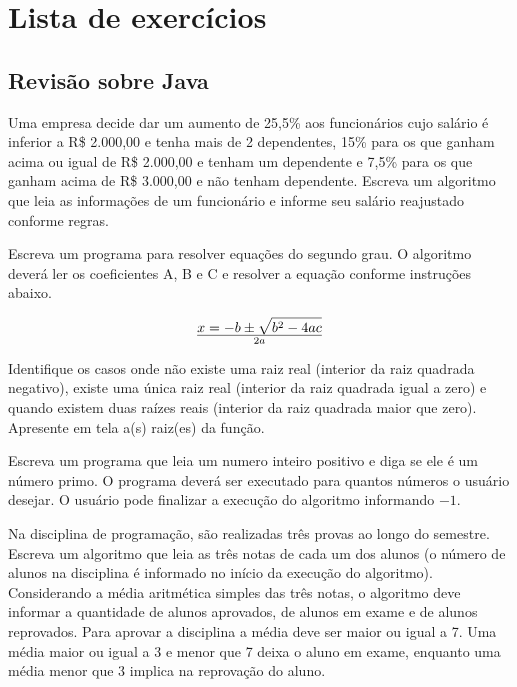\chapter{Lista de exercícios}
\renewcommand\thechapter{}
\renewcommand\thesection{\arabic{section}}

\section{Revisão sobre Java}

\begin{exercise}[Salario]
Uma empresa decide dar um aumento de 25,5\% aos funcionários cujo salário é inferior a R\$ 2.000,00 e tenha mais de 2 dependentes, 15\% para os que ganham acima ou igual de R\$ 2.000,00 e tenham um dependente e 7,5\% para os que ganham acima de R\$ 3.000,00 e não tenham dependente. Escreva um algoritmo que leia as informações de um funcionário e informe seu salário reajustado conforme regras.
\end{exercise}

\begin{exercise}[Bhaskara]
Escreva um programa para resolver equações do segundo grau. O algoritmo deverá ler os coeficientes A, B e C e resolver a equação conforme instruções abaixo.

$$
x = {-b \pm \sqrt{b^2 - 4ac}} \over {2a}
$$

Identifique os casos onde não existe uma raiz real (interior da raiz quadrada negativo), existe uma única raiz real (interior da raiz quadrada igual a zero) e quando existem duas raízes reais (interior da raiz quadrada maior que zero). Apresente em tela a(s) raiz(es) da função.

\end{exercise}

\begin{exercise}[NumeroPrimo]
Escreva um programa que leia um numero inteiro positivo e diga se ele é um número primo. O programa deverá ser executado para quantos números o usuário desejar. O usuário pode finalizar a execução do algoritmo informando $-1$.
\end{exercise}

\begin{exercise}[MediaTurma]
Na disciplina de programação, são realizadas três provas ao longo do semestre. Escreva um algoritmo que leia as três notas de cada um dos alunos (o número de alunos na disciplina é informado no início da execução do algoritmo). Considerando a média aritmética simples das três notas, o algoritmo deve informar a quantidade de alunos aprovados, de alunos em exame e de alunos reprovados. Para aprovar a disciplina a média deve ser maior ou igual a 7. Uma média maior ou igual a 3 e menor que 7 deixa o aluno em exame, enquanto uma média menor que 3 implica na reprovação do aluno.
\end{exercise}

